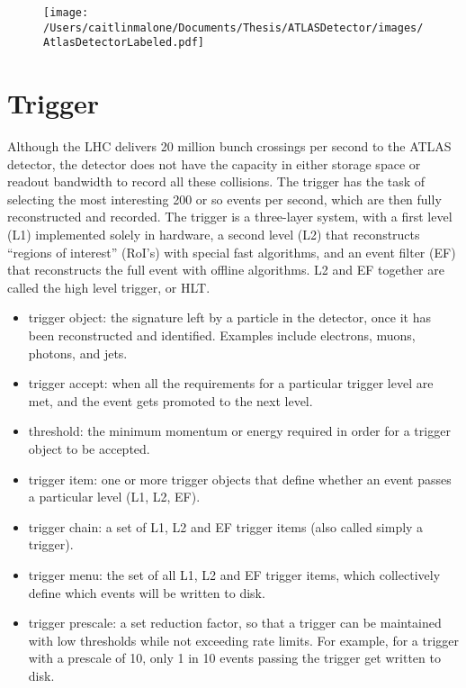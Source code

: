 \begin{figure}
	\texttt{[image: /Users/caitlinmalone/Documents/Thesis/ATLASDetector/images/AtlasDetectorLabeled.pdf]}	\label{fig:detector}
\end{figure}

\section{Trigger}
\label{sec:atlas_trig}
Although the LHC delivers 20 million bunch crossings per second to the ATLAS detector, the detector does not have the capacity in either storage space or readout bandwidth to record all these collisions.  The trigger has the task of selecting the most interesting 200 or so events per second, which are then fully reconstructed and recorded.  The trigger is a three-layer system, with a first level (L1) implemented solely in hardware, a second level (L2) that reconstructs ``regions of interest'' (RoI's) with special fast algorithms, and an event filter (EF) that reconstructs the full event with offline algorithms.  L2 and EF together are called the high level trigger, or HLT.

\begin{itemize}
	\item trigger object: the signature left by a particle in the detector, once it has been reconstructed and identified.  Examples include electrons, muons, photons, and jets.
	\item trigger accept: when all the requirements for a particular trigger level are met, and the event gets promoted to the next level.
	\item threshold: the minimum momentum or energy required in order for a trigger object to be accepted.
	\item trigger item: one or more trigger objects that define whether an event passes a particular level (L1, L2, EF).
	\item trigger chain: a set of L1, L2 and EF trigger items (also called simply a trigger).
	\item trigger menu: the set of all L1, L2 and EF trigger items, which collectively define which events will be written to disk.
	\item trigger prescale: a set reduction factor, so that a trigger can be maintained with low thresholds while not exceeding rate limits.  For example, for a trigger with a prescale of 10, only 1 in 10 events passing the trigger get written to disk.
\end{itemize}
 

